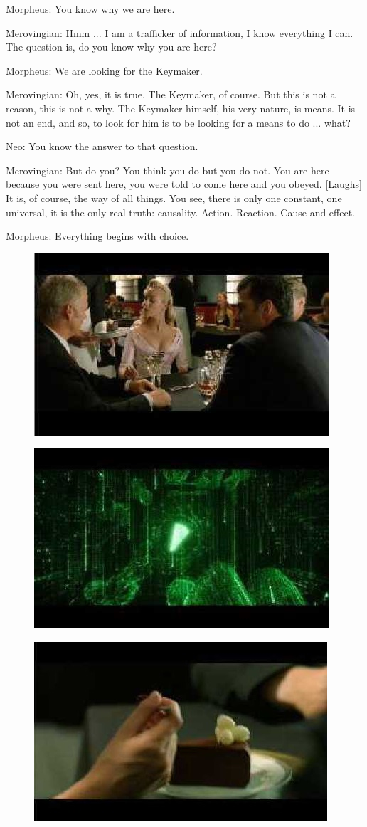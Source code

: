 \documentclass{ctexart}
\newenvironment{myquote}{\color{green} \setlength{\leftskip}{6em} \setlength{\rightskip}{4em} \setlength{\parindent}{-2em}}{\par}
\begin{document}
\begin{myquote}
Morpheus: You know why we are here.

Merovingian: Hmm ... I am a trafficker of information, I know everything I can. The question is, do you know why you are here?

Morpheus: We are looking for the Keymaker.

Merovingian: Oh, yes, it is true. The Keymaker, of course. But this is not a reason, this is not a why. The Keymaker himself, his very nature, is means. It is not an end, and so, to look for him is to be looking for a means to do ... what?

Neo: You know the answer to that question.

Merovingian: But do you? You think you do but you do not. You are here because you were sent here, you were told to come here and you obeyed. [Laughs] It is, of course, the way of all things. You see, there is only one constant, one universal, it is the only real truth: causality. Action. Reaction. Cause and effect.

Morpheus: Everything begins with choice.

\begin{figure}[htb]
\centering
\includegraphics[width=0.5\linewidth]{fig/read_reloaded-96}
\end{figure}

\begin{figure}[htb]
\centering
\includegraphics[width=0.5\linewidth]{fig/read_reloaded-96-1}
\end{figure}

\begin{figure}[htb]
\centering
\includegraphics[width=0.5\linewidth]{fig/read_reloaded-96-2}
\end{figure}


\end{myquote}
\end{document}
